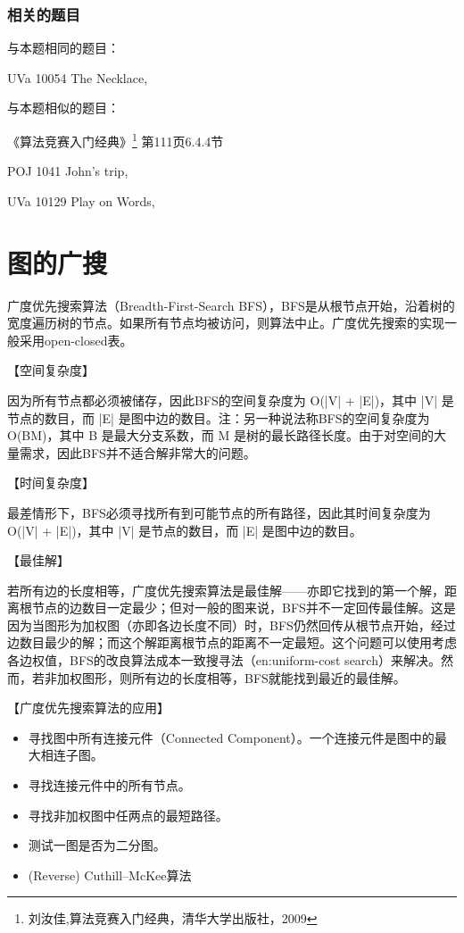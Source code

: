 \subsubsection{相关的题目}

与本题相同的题目：
\begindot
\item  UVa 10054 The Necklace, 
\myenddot

与本题相似的题目：
\begindot
\item 《算法竞赛入门经典》\footnote{刘汝佳,算法竞赛入门经典，清华大学出版社，2009} 第111页6.4.4节
\item POJ 1041 John's trip, 
\item UVa 10129 Play on Words, 
\myenddot


\section{图的广搜} %

广度优先搜索算法（Breadth-First-Search BFS），BFS是从根节点开始，沿着树的宽度遍历树的节点。如果所有节点均被访问，则算法中止。广度优先搜索的实现一般采用open-closed表。

【空间复杂度】

因为所有节点都必须被储存，因此BFS的空间复杂度为 O(|V| + |E|)，其中 |V| 是节点的数目，而 |E| 是图中边的数目。注：另一种说法称BFS的空间复杂度为 O(BM)，其中 B 是最大分支系数，而 M 是树的最长路径长度。由于对空间的大量需求，因此BFS并不适合解非常大的问题。

【时间复杂度】

最差情形下，BFS必须寻找所有到可能节点的所有路径，因此其时间复杂度为 O(|V| + |E|)，其中 |V| 是节点的数目，而 |E| 是图中边的数目。

【最佳解】

若所有边的长度相等，广度优先搜索算法是最佳解——亦即它找到的第一个解，距离根节点的边数目一定最少；但对一般的图来说，BFS并不一定回传最佳解。这是因为当图形为加权图（亦即各边长度不同）时，BFS仍然回传从根节点开始，经过边数目最少的解；而这个解距离根节点的距离不一定最短。这个问题可以使用考虑各边权值，BFS的改良算法成本一致搜寻法（en:uniform-cost search）来解决。然而，若非加权图形，则所有边的长度相等，BFS就能找到最近的最佳解。

【广度优先搜索算法的应用】

\begin{itemize}
  \item 寻找图中所有连接元件（Connected Component）。一个连接元件是图中的最大相连子图。
  \item 寻找连接元件中的所有节点。
  \item 寻找非加权图中任两点的最短路径。
  \item 测试一图是否为二分图。
  \item (Reverse) Cuthill–McKee算法
\end{itemize}


